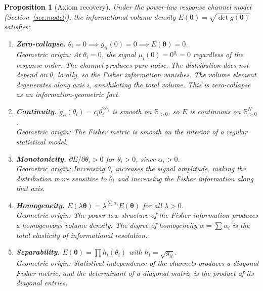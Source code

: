 \documentclass[12pt, a4paper]{article}
\newcommand{\Rp}{\mathbb{R}_{>0}}
\newtheorem{proposition}[theorem]{Proposition}
\theoremstyle{definition}
\theoremstyle{remark}
\begin{document}
\begin{proposition}[Axiom recovery]\label{prop:axioms}
Under the power-law response channel model (Section~\ref{sec:model}), the informational volume density $E(\boldsymbol{\theta}) = \sqrt{\det g(\boldsymbol{\theta})}$ satisfies:
\begin{enumerate}
\item \textbf{Zero-collapse.} $\theta_i = 0 \implies g_{ii}(0) = 0 \implies E(\boldsymbol{\theta}) = 0$. \\
\textit{Geometric origin:} At $\theta_i = 0$, the signal $\mu_i(0) = 0^{q_i} = 0$ regardless of the response order. The channel produces pure noise. The distribution does not depend on $\theta_i$ locally, so the Fisher information vanishes. The volume element degenerates along axis $i$, annihilating the total volume. This is zero-collapse as an information-geometric fact.

\item \textbf{Continuity.} $g_{ii}(\theta_i) = c_i \theta_i^{2\alpha_i}$ is smooth on $\Rp$, so $E$ is continuous on $\Rp^N$. \\
\textit{Geometric origin:} The Fisher metric is smooth on the interior of a regular statistical model.

\item \textbf{Monotonicity.} $\partial E / \partial \theta_i > 0$ for $\theta_i > 0$, since $\alpha_i > 0$. \\
\textit{Geometric origin:} Increasing $\theta_i$ increases the signal amplitude, making the distribution more sensitive to $\theta_i$ and increasing the Fisher information along that axis.

\item \textbf{Homogeneity.} $E(\lambda \boldsymbol{\theta}) = \lambda^{\sum \alpha_i} E(\boldsymbol{\theta})$ for all $\lambda > 0$. \\
\textit{Geometric origin:} The power-law structure of the Fisher information produces a homogeneous volume density. The degree of homogeneity $\alpha = \sum \alpha_i$ is the total elasticity of informational resolution.

\item \textbf{Separability.} $E(\boldsymbol{\theta}) = \prod h_i(\theta_i)$ with $h_i = \sqrt{g_{ii}}$. \\
\textit{Geometric origin:} Statistical independence of the channels produces a diagonal Fisher metric, and the determinant of a diagonal matrix is the product of its diagonal entries.
\end{enumerate}
\end{proposition}
\end{document}

